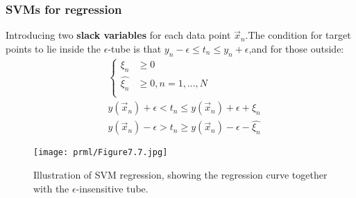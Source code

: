 \subsubsection{SVMs for regression}

Introducing two \textbf{slack variables} for each data point $\vec{x}_n$.The condition for target points to lie inside the $\epsilon$-tube is that $y_n -\epsilon \leq t_n \leq y_n+\epsilon$,and for those outside:
\begin{align}
&\begin{cases}
\xi_n &\geq 0\\
\hat{\xi_n} &\geq 0,n=1,...,N\\
\end{cases}\\
& y(\vec{x}_n)+\epsilon < t_n \leq y(\vec{x}_n)+\epsilon +\xi_n \\
& y(\vec{x}_n)-\epsilon > t_n \geq y(\vec{x}_n)-\epsilon -\hat{\xi_n}
\end{align}
\begin{SCfigure*}
	\caption{Illustration of SVM regression, showing the regression curve together with the $\epsilon$-insensitive tube. }
	\texttt{[image: prml/Figure7.7.jpg]}
\end{SCfigure*}

